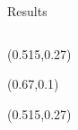 \documentclass{beamer}
\begin{document}
\begin{frame}{Results}
\begin{columns}
\begin{center}
\begin{textblock}{0.48}(0.515,0.27)
\end{textblock}
\begin{textblock}{0.2}(0.67,0.1)
\end{textblock}
\begin{textblock}{0.48}(0.515,0.27)

\end{textblock}
\end{center}
\end{columns}
\end{frame}
\end{document}
